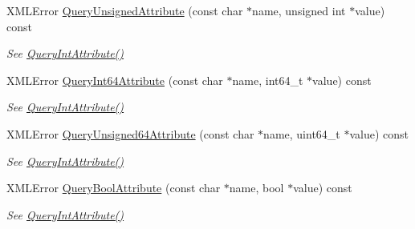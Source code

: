 \begin{DoxyCompactItemize}
X\+M\+L\+Error \hyperlink{classtinyxml2_1_1_x_m_l_element_a26fc84cbfba6769dafcfbf256c05e22f}{Query\+Unsigned\+Attribute} (const char $\ast$name, unsigned int $\ast$value) const
\begin{DoxyCompactList}\small\item\em See \hyperlink{classtinyxml2_1_1_x_m_l_element_a8a78bc1187c1c45ad89f2690eab567b1}{Query\+Int\+Attribute()} \end{DoxyCompactList}\item 
\mbox{\label{classtinyxml2_1_1_x_m_l_element_a7c0955d80b6f8d196744eacb0f6e90a8}} 
X\+M\+L\+Error \hyperlink{classtinyxml2_1_1_x_m_l_element_a7c0955d80b6f8d196744eacb0f6e90a8}{Query\+Int64\+Attribute} (const char $\ast$name, int64\+\_\+t $\ast$value) const
\begin{DoxyCompactList}\small\item\em See \hyperlink{classtinyxml2_1_1_x_m_l_element_a8a78bc1187c1c45ad89f2690eab567b1}{Query\+Int\+Attribute()} \end{DoxyCompactList}\item 
\mbox{\label{classtinyxml2_1_1_x_m_l_element_a13dd590b5d3958ce2ed79844aacd9405}} 
X\+M\+L\+Error \hyperlink{classtinyxml2_1_1_x_m_l_element_a13dd590b5d3958ce2ed79844aacd9405}{Query\+Unsigned64\+Attribute} (const char $\ast$name, uint64\+\_\+t $\ast$value) const
\begin{DoxyCompactList}\small\item\em See \hyperlink{classtinyxml2_1_1_x_m_l_element_a8a78bc1187c1c45ad89f2690eab567b1}{Query\+Int\+Attribute()} \end{DoxyCompactList}\item 
\mbox{\label{classtinyxml2_1_1_x_m_l_element_a14c1bb77c39689838be01838d86ca872}} 
X\+M\+L\+Error \hyperlink{classtinyxml2_1_1_x_m_l_element_a14c1bb77c39689838be01838d86ca872}{Query\+Bool\+Attribute} (const char $\ast$name, bool $\ast$value) const
\begin{DoxyCompactList}\small\item\em See \hyperlink{classtinyxml2_1_1_x_m_l_element_a8a78bc1187c1c45ad89f2690eab567b1}{Query\+Int\+Attribute()} \end{DoxyCompactList}\item 
\mbox{\label{classtinyxml2_1_1_x_m_l_element_a5f0964e2dbd8e2ee7fce9beab689443c}} 

\end{DoxyCompactItemize}
